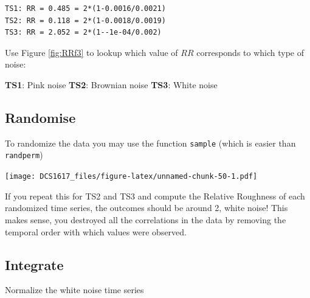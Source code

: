 \documentclass[]{book}
\newenvironment{Shaded}{\begin{snugshade}}{\end{snugshade}}
\newcommand{\KeywordTok}[1]{\textcolor[rgb]{0.13,0.29,0.53}{\textbf{{#1}}}}
\newcommand{\DataTypeTok}[1]{\textcolor[rgb]{0.13,0.29,0.53}{{#1}}}
\newcommand{\StringTok}[1]{\textcolor[rgb]{0.31,0.60,0.02}{{#1}}}
\newcommand{\CommentTok}[1]{\textcolor[rgb]{0.56,0.35,0.01}{\textit{{#1}}}}
\newcommand{\NormalTok}[1]{{#1}}
\begin{document}
\begin{verbatim}
TS1: RR = 0.485 = 2*(1-0.0016/0.0021)
TS2: RR = 0.118 = 2*(1-0.0018/0.0019)
TS3: RR = 2.052 = 2*(1--1e-04/0.002)
\end{verbatim}

Use Figure \ref{fig:RRf3} to lookup which value of \(RR\) corresponds to
which type of noise:

\textbf{TS1}: Pink noise \textbf{TS2}: Brownian noise \textbf{TS3}:
White noise

\subsection{Randomise}\label{randomise}

To randomize the data you may use the function \texttt{sample} (which is
easier than \texttt{randperm})

\begin{Shaded}
\end{Shaded}

\texttt{[image: DCS1617\_files/figure-latex/unnamed-chunk-50-1.pdf]}

If you repeat this for TS2 and TS3 and compute the Relative Roughness of
each randomized time series, the outcomes should be around 2, white
noise! This makes sense, you destroyed all the correlations in the data
by removing the temporal order with which values were observed.

\subsection{Integrate}\label{integrate}

Normalize the white noise time series

\begin{Shaded}
\end{Shaded}
\end{document}
